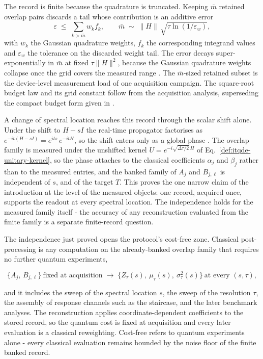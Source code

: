 The record is finite because the quadrature is truncated. Keeping $\bar m$ retained overlap pairs discards a tail whose contribution is an additive error
\[
\varepsilon \;\le\; \sum_{k > \bar m} w_k f_k, \qquad \bar m \;\sim\; \|H\|\,\sqrt{\tau \ln(1/\varepsilon_w)},
\]
with $w_k$ the Gaussian quadrature weights, $f_k$ the corresponding integrand values and $\varepsilon_w$ the tolerance on the discarded weight tail. The error decays super-exponentially in $\bar m$ at fixed $\tau\|H\|^2$, because the Gaussian quadrature weights collapse once the grid covers the measured range \cite{leamer2024emulation,mccaul2025snacks}. The $\bar m$-sized retained subset is the device-level measurement load of one acquisition campaign. The square-root budget law and its grid constant follow from the acquisition analysis, superseding the compact budget form given in \cite{mccaul2025snacks}.

A change of spectral location reaches this record through the scalar shift alone. Under the shift to $H - sI$ the real-time propagator factorises as $e^{-i t (H - sI)} = e^{i t s}\, e^{-i t H}$, so the shift enters only as a global phase \cite{mccaul2025snacks}. The overlap family is measured under the unshifted kernel $U = e^{-i\sqrt{\Delta\tau/2}\,H}$ of Eq.~\eqref{def:itqde-unitary-kernel}, so the phase attaches to the classical coefficients $\alpha_j$ and $\beta_j$ rather than to the measured entries, and the banked family of $A_j$ and $B_{j,\ell}$ is independent of $s$, and of the target $T$. This proves the one narrow claim of the introduction at the level of the measured objects: one record, acquired once, supports the readout at every spectral location. The independence holds for the measured family itself - the accuracy of any reconstruction evaluated from the finite family is a separate finite-record question.

The independence just proved opens the protocol's cost-free zone. Classical post-processing is any computation on the already-banked overlap family that requires no further quantum experiments,
\begin{widetext}
\[
\{A_j,\, B_{j,\ell}\}\ \text{fixed at acquisition} \;\longrightarrow\; \bigl\{Z_\tau(s),\ \mu_\tau(s),\ \sigma_\tau^2(s)\bigr\}\ \text{at every } (s, \tau),
\]
\end{widetext}
and it includes the sweep of the spectral location $s$, the sweep of the resolution $\tau$, the assembly of response channels such as the staircase, and the later benchmark analyses. The reconstruction applies coordinate-dependent coefficients to the stored record, so the quantum cost is fixed at acquisition and every later evaluation is a classical reweighting. Cost-free refers to quantum experiments alone - every classical evaluation remains bounded by the noise floor of the finite banked record.


